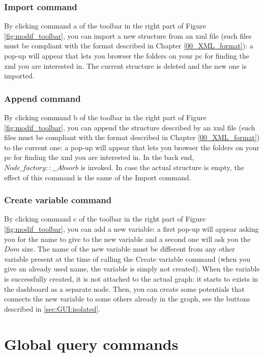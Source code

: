 \subsubsection{Import command}

By clicking command a of the toolbar in the right part of Figure \ref{fig:modif_toolbar}, you can import a new structure from an xml file (such files must be compliant with the format described in Chapter \ref{00_XML_format}): a pop-up will appear that lets you browser the folders on your pc for finding the xml you are interested in. The current structure is deleted and the new one is imported.

\subsubsection{Append command}

By clicking command b of the toolbar in the right part of Figure \ref{fig:modif_toolbar}, you can append the structure described by an xml file (such files must be compliant with the format described in Chapter \ref{00_XML_format}) to the current one: a pop-up will appear that lets you browser the folders on your pc for finding the xml you are interested in. In the back end, $Node\_factory::\_\_Absorb$ is invoked. In case the actual structure is empty, the effect of this command is the same of the Import command.

\subsubsection{Create variable command}

By clicking command c of the toolbar in the right part of Figure \ref{fig:modif_toolbar}, you can add a new variable: a first pop-up will appear asking you for the name to give to the new variable and a second one will ask you the $Dom$ size. The name of the new variable must be different from any other variable present at the time of calling the Create variable command (when you give an already used name, the variable is simply not created). When the variable is successfully created, it is not attached to the actual graph: it starts to exists in the dashboard as a separate node. Then, you can create some potentials that connects the new variable to some others already in the graph, see the buttons described in \ref{sec:GUI:isolated}.

\section{Global query commands}

